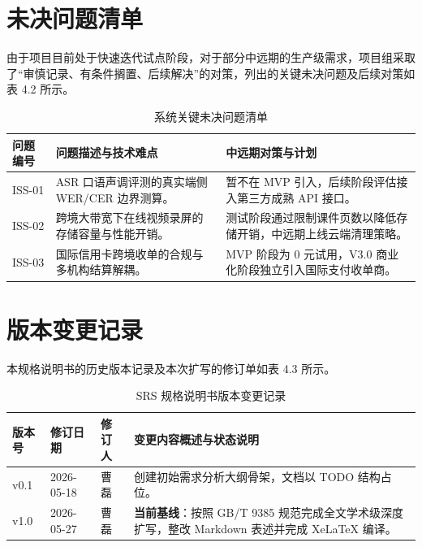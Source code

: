 \section{未决问题清单}
由于项目目前处于快速迭代试点阶段，对于部分中远期的生产级需求，项目组采取了“审慎记录、有条件搁置、后续解决”的对策，列出的关键未决问题及后续对策如表 4.2 所示。

\begin{table}[H]
\centering
\caption{系统关键未决问题清单}
\begin{tabularx}{\textwidth}{l p{5cm} X}
\toprule
\textbf{问题编号} & \textbf{问题描述与技术难点} & \textbf{中远期对策与计划} \\
\midrule
ISS-01 & ASR 口语声调评测的真实端侧 WER/CER 边界测算。 & 暂不在 MVP 引入，后续阶段评估接入第三方成熟 API 接口。 \\
ISS-02 & 跨境大带宽下在线视频录屏的存储容量与性能开销。 & 测试阶段通过限制课件页数以降低存储开销，中远期上线云端清理策略。 \\
ISS-03 & 国际信用卡跨境收单的合规与多机构结算解耦。 & MVP 阶段为 0 元试用，V3.0 商业化阶段独立引入国际支付收单商。 \\
\bottomrule
\end{tabularx}
\end{table}

\section{版本变更记录}
本规格说明书的历史版本记录及本次扩写的修订单如表 4.3 所示。

\begin{table}[H]
\centering
\caption{SRS 规格说明书版本变更记录}
\begin{tabularx}{\textwidth}{l l l X}
\toprule
\textbf{版本号} & \textbf{修订日期} & \textbf{修订人} & \textbf{变更内容概述与状态说明} \\
\midrule
v0.1 & 2026-05-18 & 曹磊 & 创建初始需求分析大纲骨架，文档以 TODO 结构占位。 \\
v1.0 & 2026-05-27 & 曹磊 & \textbf{当前基线}：按照 GB/T 9385 规范完成全文学术级深度扩写，整改 Markdown 表述并完成 XeLaTeX 编译。 \\
\bottomrule
\end{tabularx}
\end{table}
